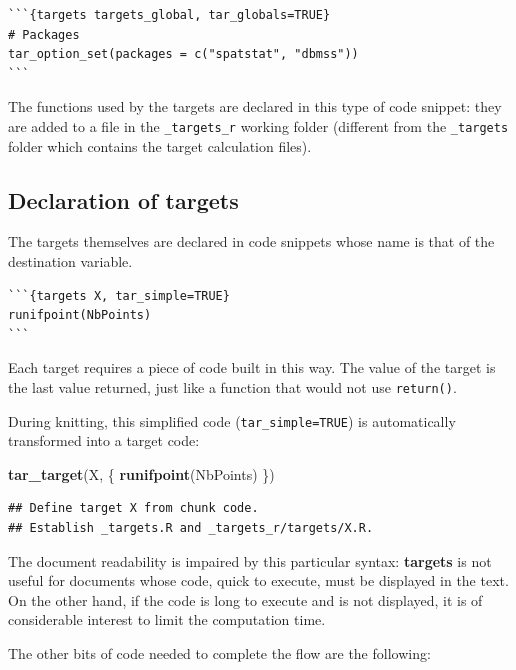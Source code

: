 \documentclass[
  12pt,
  american,
  a4paper,
  extrafontsizes,onecolumn,openright
  ]{memoir}
\newenvironment{Shaded}{\begin{snugshade}}{\end{snugshade}}
\newcommand{\FunctionTok}[1]{\textcolor[rgb]{0.13,0.29,0.53}{\textbf{#1}}}
\newcommand{\NormalTok}[1]{#1}
\begin{document}
\begin{verbatim}
```{targets targets_global, tar_globals=TRUE}
# Packages
tar_option_set(packages = c("spatstat", "dbmss"))
```
\end{verbatim}

The functions used by the targets are declared in this type of code snippet: they are added to a file in the \texttt{\_targets\_r} working folder (different from the \texttt{\_targets} folder which contains the target calculation files).

\subsection{Declaration of targets}\label{declaration-of-targets}

The targets themselves are declared in code snippets whose name is that of the destination variable.

\begin{verbatim}
```{targets X, tar_simple=TRUE}
runifpoint(NbPoints)
```
\end{verbatim}

Each target requires a piece of code built in this way.
The value of the target is the last value returned, just like a function that would not use \texttt{return()}.

During knitting, this simplified code (\texttt{tar\_simple=TRUE}) is automatically transformed into a target code:

\scriptsize

\begin{Shaded}
\begin{Highlighting}[]
\FunctionTok{tar\_target}\NormalTok{(X, \{}
  \FunctionTok{runifpoint}\NormalTok{(NbPoints)}
\NormalTok{\})}
\end{Highlighting}
\end{Shaded}

\begin{verbatim}
## Define target X from chunk code.
## Establish _targets.R and _targets_r/targets/X.R.
\end{verbatim}

\normalsize

The document readability is impaired by this particular syntax: \textbf{targets} is not useful for documents whose code, quick to execute, must be displayed in the text.
On the other hand, if the code is long to execute and is not displayed, it is of considerable interest to limit the computation time.

The other bits of code needed to complete the flow are the following:
\end{document}
